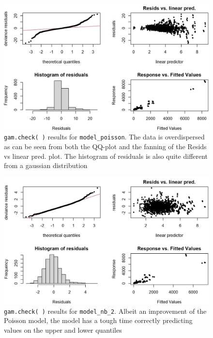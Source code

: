 \begin{figure}[H]
\centering
\includegraphics[scale=0.5]{model_poisson_check.jpg}
\caption{\label{fig:model_poisson_check}\texttt{gam.check( )} results for \texttt{model\_poisson}. The data is overdispersed as can be seen from both the QQ-plot and the fanning of the Resids vs linear pred. plot. The histogram of residuals is also quite different from a gaussian distribution}
\end{figure}

\begin{figure}[H]
\centering
\includegraphics[scale=0.5]{model_nb_2_check.jpg}
\caption{\label{fig:model_nb_2_check}\texttt{gam.check( )} results for \texttt{model\_nb\_2}. Albeit an improvement of the Poisson model, the model has a tough time correctly predicting values on the upper and lower quantiles}
\end{figure}

